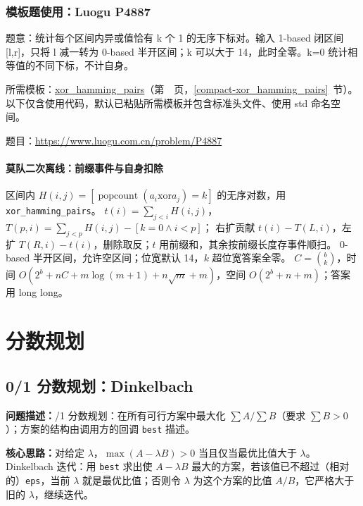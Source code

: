 \Needspace{351pt}

\subsection*{模板题使用：Luogu P4887}

\label{usage-example-111}

题意：统计每个区间内异或值恰有 k 个 1 的无序下标对。输入 1-based 闭区间 [l,r]，只将 l 减一转为 0-based 半开区间；k 可以大于 14，此时全零。k=0 统计相等值的不同下标，不计自身。

所需模板：\hyperref[compact-xor_hamming_pairs]{xor\_\allowbreak{}hamming\_\allowbreak{}pairs}（第~\pageref{compact-xor_hamming_pairs}~页，\ref{compact-xor_hamming_pairs}~节）。以下仅含使用代码，默认已粘贴所需模板并包含标准头文件、使用 std 命名空间。

题目：\url{https://www.luogu.com.cn/problem/P4887}



\subsubsection{莫队二次离线：前缀事件与自身扣除}\label{knowledge-mo-secondary}
区间内 $H(i,j)=[\operatorname{popcount}(a_i\mathbin{\mathrm{xor}}a_j)=k]$ 的无序对数，用 \texttt{xor\_hamming\_pairs}。
$t(i)=\sum_{j<i}H(i,j)$，$T(p,i)=\sum_{j<p}H(i,j)-[k=0\land i<p]$；
右扩贡献 $t(i)-T(L,i)$，左扩 $T(R,i)-t(i)$，删除取反；$t$ 用前缀和，其余按前缀长度存事件顺扫。
0-based 半开区间，允许空区间；位宽默认 14，$k$ 超位宽答案全零。
$C=\binom bk$，时间 $O(2^b+nC+m\log(m+1)+n\sqrt m+m)$，空间 $O(2^b+n+m)$；答案用 long long。


\Needspace{362pt}

\chapter{分数规划}

\section{0/1 分数规划：Dinkelbach}\label{compact-dinkelbach}

\noindent\textbf{问题描述：}/1 分数规划：在所有可行方案中最大化 $\sum A/\sum B$（要求 $\sum B>0$）；方案的结构由调用方的回调 \texttt{best} 描述。

\textbf{核心思路：}\allowbreak 对给定 $\lambda$，$\max(A-\lambda B)>0$ 当且仅当最优比值大于 $\lambda$。Dinkelbach 迭代：用 \texttt{best} 求出使 $A-\lambda B$ 最大的方案，若该值已不超过（相对的）\texttt{eps}，当前 $\lambda$ 就是最优比值；否则令 $\lambda$ 为这个方案的比值 $A/B$，它严格大于旧的 $\lambda$，继续迭代。



